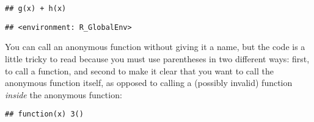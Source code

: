 \begin{Shaded}
\begin{Highlighting}[]
\NormalTok{(}\NormalTok{(} \NormalTok{) }\OperatorTok{+}\StringTok{ }
\end{Highlighting}
\end{Shaded}

\begin{verbatim}
## g(x) + h(x)
\end{verbatim}

\begin{Shaded}
\begin{Highlighting}[]
\NormalTok{(}\NormalTok{(} \NormalTok{) }\OperatorTok{+}\StringTok{ }
\end{Highlighting}
\end{Shaded}

\begin{verbatim}
## <environment: R_GlobalEnv>
\end{verbatim}

You can call an anonymous function without giving it a name, but the
code is a little tricky to read because you must use parentheses in two
different ways: first, to call a function, and second to make it clear
that you want to call the anonymous function itself, as opposed to
calling a (possibly invalid) function \emph{inside} the anonymous
function:

\begin{Shaded}
\begin{Highlighting}[]
\NormalTok{()}
\end{Highlighting}
\end{Shaded}

\begin{verbatim}
## function(x) 3()
\end{verbatim}

\begin{Shaded}
\begin{Highlighting}[]
\NormalTok{(}\NormalTok{)()}
\end{Highlighting}
\end{Shaded}

